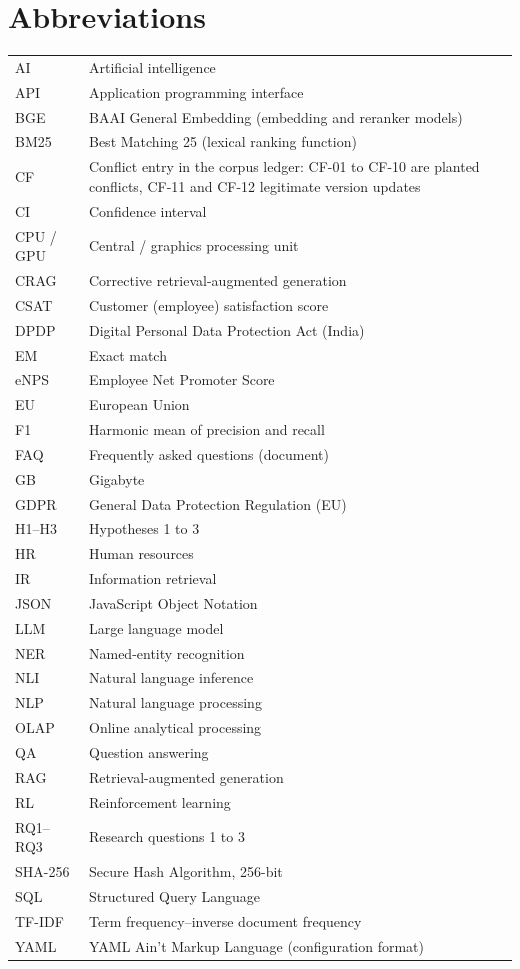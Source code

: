 \documentclass[11pt,letterpaper,oneside]{report}
\begin{document}
\chapter*{Abbreviations}
\begin{tabularx}{\textwidth}{@{}lX@{}}
AI & Artificial intelligence \\
API & Application programming interface \\
BGE & BAAI General Embedding (embedding and reranker models) \\
BM25 & Best Matching 25 (lexical ranking function) \\
CF & Conflict entry in the corpus ledger: CF-01 to CF-10 are planted conflicts, CF-11 and CF-12 legitimate version updates \\
CI & Confidence interval \\
CPU / GPU & Central / graphics processing unit \\
CRAG & Corrective retrieval-augmented generation \\
CSAT & Customer (employee) satisfaction score \\
DPDP & Digital Personal Data Protection Act (India) \\
EM & Exact match \\
eNPS & Employee Net Promoter Score \\
EU & European Union \\
F1 & Harmonic mean of precision and recall \\
FAQ & Frequently asked questions (document) \\
GB & Gigabyte \\
GDPR & General Data Protection Regulation (EU) \\
H1--H3 & Hypotheses 1 to 3 \\
HR & Human resources \\
IR & Information retrieval \\
JSON & JavaScript Object Notation \\
LLM & Large language model \\
NER & Named-entity recognition \\
NLI & Natural language inference \\
NLP & Natural language processing \\
OLAP & Online analytical processing \\
QA & Question answering \\
RAG & Retrieval-augmented generation \\
RL & Reinforcement learning \\
RQ1--RQ3 & Research questions 1 to 3 \\
SHA-256 & Secure Hash Algorithm, 256-bit \\
SQL & Structured Query Language \\
TF-IDF & Term frequency--inverse document frequency \\
YAML & YAML Ain't Markup Language (configuration format) \\
\end{tabularx}
\end{document}
